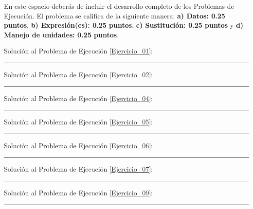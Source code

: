 \documentclass[12pt, letter]{exam}
\begin{document}
\newpage

En este espacio deberás de incluir el desarrollo completo de los Problemas de Ejecución. El problema se califica de la siguiente manera: \textbf{a) Datos: 0.25 puntos}, \textbf{b) Expresión(es): 0.25 puntos}, \textbf{c) Sustitución: 0.25 puntos} y \textbf{d) Manejo de unidades: 0.25 puntos}.

\vspace*{0.5cm}

Solución al Problema de Ejecución \ref{Ejercicio_01}:

\vspace*{3.5cm}
\rule{0.9\textwidth}{0.3mm}

Solución al Problema de Ejecución \ref{Ejercicio_02}:

\vspace*{3.5cm}
\rule{0.9\textwidth}{0.3mm}



Solución al Problema de Ejecución \ref{Ejercicio_04}:

\vspace*{3.5cm}
\rule{0.9\textwidth}{0.3mm}



Solución al Problema de Ejecución \ref{Ejercicio_05}: 

\vspace*{3.5cm}
\rule{0.9\textwidth}{0.3mm}

\newpage

Solución al Problema de Ejecución \ref{Ejercicio_06}:

\vspace*{3.5cm}
\rule{0.9\textwidth}{0.3mm}

Solución al Problema de Ejecución \ref{Ejercicio_07}:

\vspace*{3.5cm}
\rule{0.9\textwidth}{0.3mm}



Solución al Problema de Ejecución \ref{Ejercicio_09}:

\vspace*{3.5cm}
\rule{0.9\textwidth}{0.3mm}
\end{document}
